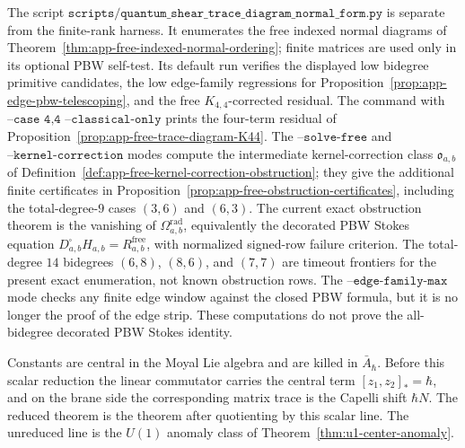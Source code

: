 \begin{rmk}
  The script
  \(\texttt{scripts/quantum\_shear\_trace\_diagram\_normal\_form.py}\)
  is separate from the finite-rank harness.  It enumerates the free
  indexed normal diagrams of
  Theorem~\ref{thm:app-free-indexed-normal-ordering}; finite matrices
  are used only in its optional PBW self-test.  Its default run verifies
  the displayed low bidegree primitive candidates, the low edge-family
  regressions for Proposition~\ref{prop:app-edge-pbw-telescoping}, and
  the free \(K_{4,4}\)-corrected residual.  The command with
  \(\texttt{--case 4,4 --classical-only}\) prints the four-term
  residual of Proposition~\ref{prop:app-free-trace-diagram-K44}.  The
  \(\texttt{--solve-free}\) and \(\texttt{--kernel-correction}\) modes
  compute the intermediate kernel-correction class
  \(\mathfrak o_{a,b}\) of
  Definition~\ref{def:app-free-kernel-correction-obstruction}; they
  give the additional finite certificates in
  Proposition~\ref{prop:app-free-obstruction-certificates}, including
  the total-degree-\(9\) cases \((3,6)\) and \((6,3)\).  The current
  exact obstruction theorem is the vanishing of
  \(\Omega^{\mathrm{rad}}_{a,b}\), equivalently the decorated PBW Stokes
  equation \(D^\square_{a,b}H_{a,b}=R^{\mathrm{free}}_{a,b}\), with
  normalized signed-row failure criterion.  The total-degree \(14\)
  bidegrees \((6,8)\), \((8,6)\), and \((7,7)\) are timeout frontiers
  for the present exact enumeration, not known obstruction rows.  The
  \(\texttt{--edge-family-max}\) mode checks any finite edge window
  against the closed PBW formula, but it is no longer the proof of the
  edge strip.  These computations do not prove the all-bidegree
  decorated PBW Stokes identity.
\end{rmk}

\begin{rmk}
\label{rmk:app-radial-scalar-quotient}
  Constants are central in the Moyal Lie algebra and are killed in
  \(\bar A_\hbar\).  Before this scalar reduction the linear
  commutator carries the central term
  \([z_1,z_2]_*= \hbar\), and on the brane side the corresponding
  matrix trace is the Capelli shift \(\hbar N\).  The reduced theorem
  is the theorem after quotienting by this scalar line.
  The unreduced line is the \(U(1)\) anomaly class of
  Theorem~\ref{thm:u1-center-anomaly}.
\end{rmk}

